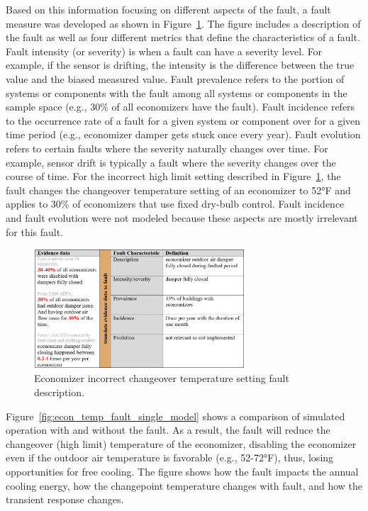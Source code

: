 Based on this information focusing on different aspects of the fault, a fault measure was developed as shown in Figure~\ref{fig:econ_temp_fault}. The figure includes a description of the fault as well as four different metrics that define the characteristics of a fault. Fault intensity (or severity) is when a fault can have a severity level. For example, if the sensor is drifting, the intensity is the difference between the true value and the biased measured value. Fault prevalence refers to the portion of systems or components with the fault among all systems or components in the sample space (e.g., 30\% of all economizers have the fault). Fault incidence refers to the occurrence rate of a fault for a given system or component over for a given time period (e.g., economizer damper gets stuck once every year). Fault evolution refers to certain faults where the severity naturally changes over time. For example, sensor drift is typically a fault where the severity changes over the course of time. For the incorrect high limit setting described in Figure~\ref{fig:econ_temp_fault}, the fault changes the changeover temperature setting of an economizer to 52°F and applies to 30\% of economizers that use fixed dry-bulb control. Fault incidence and fault evolution were not modeled because these aspects are mostly irrelevant for this fault.

\begin{figure}
  \centering \includegraphics[width=0.7\textwidth]{figures/econ_temp_fault.png}
  \caption{Economizer incorrect changeover temperature setting fault description.}
  \label{fig:econ_temp_fault}
\end{figure}

Figure~\ref{fig:econ_temp_fault_single_model} shows a comparison of simulated operation with and without the fault. As a result, the fault will reduce the changeover (high limit) temperature of the economizer, disabling the economizer even if the outdoor air temperature is favorable (e.g., 52-72°F), thus, losing opportunities for free cooling. The figure shows how the fault impacts the annual cooling energy, how the changepoint temperature changes with fault, and how the transient response changes.

